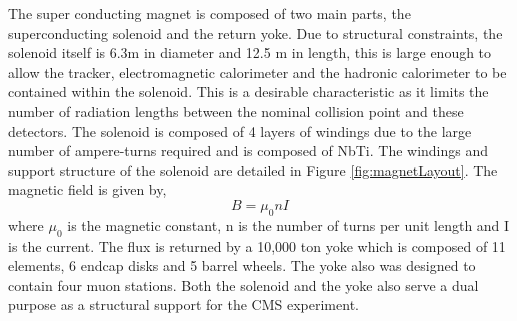 The super conducting magnet is composed of two main parts, the superconducting
solenoid and the return yoke.
Due to structural constraints, the solenoid itself is 6.3m in diameter and 12.5 m in length,
this is large enough to allow the tracker, electromagnetic calorimeter
and the hadronic calorimeter to be contained within the solenoid. This is
a desirable characteristic as it limits the number of radiation
lengths between the nominal collision point and these detectors. The solenoid
is composed of 4 layers of windings due to the large number of ampere-turns required
and is composed of NbTi. The windings and support structure of the solenoid
are detailed in Figure \ref{fig:magnetLayout}. %
The magnetic field is given by,
\begin{displaymath}
B=\mu_{0}nI
\end{displaymath}
where $\mu_{0}$ is the magnetic constant, n is the number of turns per unit length and 
I is the current. 
The flux is returned by a 10,000 ton yoke which is composed of 11 elements, 6 endcap disks 
and 5 barrel wheels. The yoke also was designed to contain four muon stations. 
Both the solenoid and the yoke also serve a dual purpose as a structural support 
for the CMS experiment. 
